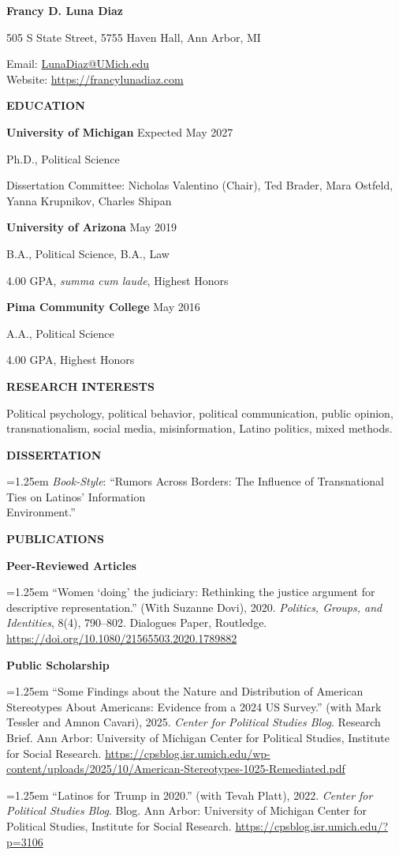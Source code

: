\documentclass[11pt]{article}
\newlength{\leftcol}
\newlength{\rightcol}
\newcommand{\cvsection}[2]{%
\vspace{1.2em}
\noindent
\begin{minipage}[t]{\leftcol}
\raggedright \bfseries #1
\end{minipage}
\hspace{0.35in}
\begin{minipage}[t]{\rightcol}
#2
\end{minipage}
\par
}
\newcommand{\entry}[1]{%
\hangindent=1.25em
\hangafter=1
#1\par\vspace{0.35em}
}
\newcommand{\subhead}[1]{%
\textbf{#1}\par\vspace{0.25em}
}
\newcommand{\schoolentry}[4]{%
\textbf{#1} \hfill #2\par
#3\par
#4\par\vspace{0.45em}
}
\begin{document}
\thispagestyle{empty}


\begin{center}
    {\huge \textbf{Francy D. Luna Diaz}}\par
    505 S State Street, 5755 Haven Hall, Ann Arbor, MI\par
    Email: \href{mailto:LunaDiaz@UMich.edu}{LunaDiaz@UMich.edu}\\
    Website: \url{https://francylunadiaz.com}
\end{center}


\cvsection{EDUCATION}{
\schoolentry{University of Michigan}{Expected May 2027}
{Ph.D., Political Science}
{Dissertation Committee: Nicholas Valentino (Chair), Ted Brader, Mara Ostfeld, Yanna Krupnikov, Charles Shipan}

\schoolentry{University of Arizona}{May 2019}
{B.A., Political Science, B.A., Law}
{4.00 GPA, \textit{summa cum laude}, Highest Honors}

\schoolentry{Pima Community College}{May 2016}
{A.A., Political Science}
{4.00 GPA, Highest Honors}
}


\cvsection{RESEARCH INTERESTS}{
Political psychology, political behavior, political communication, public opinion, transnationalism, social media, misinformation, Latino politics, mixed methods.}

\cvsection{DISSERTATION}{

\entry{\textit{Book-Style}: ``Rumors Across Borders: The Influence of Transnational Ties on Latinos’ Information \\ Environment.''}}

\cvsection{PUBLICATIONS}{
\subhead{Peer-Reviewed Articles}

\entry{``Women `doing' the judiciary: Rethinking the justice argument for descriptive representation.'' (With Suzanne Dovi), 2020. \textit{Politics, Groups, and Identities}, 8(4), 790--802. Dialogues Paper, Routledge. \url{https://doi.org/10.1080/21565503.2020.1789882}}

\subhead{Public Scholarship}

\entry{``Some Findings about the Nature and Distribution of American Stereotypes About Americans: Evidence from a 2024 US Survey.'' (with Mark Tessler and Amnon Cavari), 2025. \textit{Center for Political Studies Blog}. Research Brief. Ann Arbor: University of Michigan Center for Political Studies, Institute for Social Research. \url{https://cpsblog.isr.umich.edu/wp-content/uploads/2025/10/American-Stereotypes-1025-Remediated.pdf}}

\entry{``Latinos for Trump in 2020.'' (with Tevah Platt), 2022. \textit{Center for Political Studies Blog}. Blog. Ann Arbor: University of Michigan Center for Political Studies, Institute for Social Research. \url{https://cpsblog.isr.umich.edu/?p=3106}}
}
\end{document}
